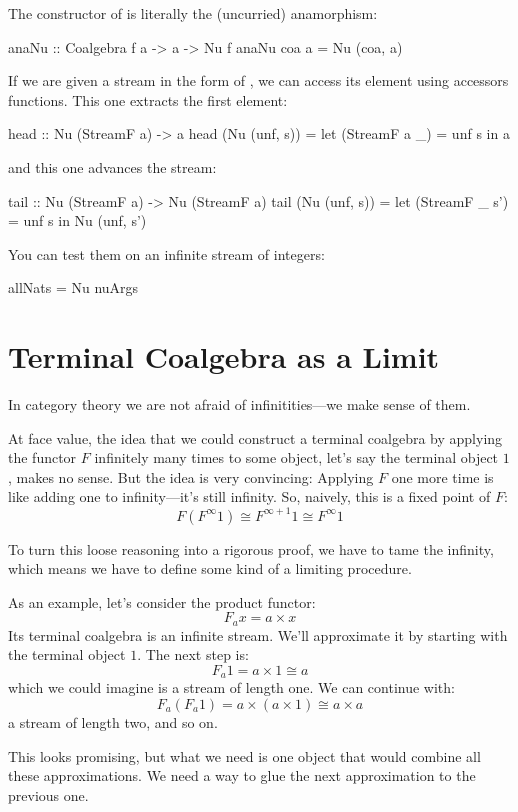 \documentclass[DaoFP]{subfiles}
\begin{document}
The constructor of  is literally the (uncurried) anamorphism:
\begin{haskell}
anaNu :: Coalgebra f a -> a -> Nu f
anaNu coa a = Nu (coa, a)
\end{haskell}

If we are given a stream in the form of , we can access its element using accessors functions. This one extracts the first element:
\begin{haskell}
head :: Nu (StreamF a) -> a
head (Nu (unf, s)) = 
  let (StreamF a _) = unf s 
  in a
\end{haskell}
and this one advances the stream:
\begin{haskell}
tail :: Nu (StreamF a) -> Nu (StreamF a)
tail (Nu (unf, s)) = 
  let (StreamF _ s') = unf s 
  in Nu (unf, s')
\end{haskell}
You can test them on an infinite stream of integers:
\begin{haskell}
allNats = Nu nuArgs
\end{haskell}

\section{Terminal Coalgebra as a Limit}

In category theory we are not afraid of infinitities---we make sense of them. 

At face value, the idea that we could construct a terminal coalgebra by applying the functor $F$ infinitely many times to some object, let's say the terminal object $1$, makes no sense. But the idea is very convincing: Applying $F$ one more time is like adding one to infinity---it's still infinity. So, naively, this is a fixed point of $F$:
\[ F (F^{\infty} 1) \cong F^{\infty + 1} 1 \cong F^{\infty} 1\]

To turn this loose reasoning into a rigorous proof, we have to tame the infinity, which means we have to define some kind of a limiting procedure. 

As an example, let's consider the product functor:
\[F_a x = a \times x \]
Its terminal coalgebra is an infinite stream. We'll approximate it by starting with the terminal object $1$. The next step is:
\[ F_a 1 = a \times 1 \cong a \]
which we could imagine is a stream of length one. We can continue with:
\[ F_a (F_a 1) = a \times (a \times 1) \cong a \times a \]
a stream of length two, and so on. 

This looks promising, but what we need is one object that would combine all these approximations. We need a way to glue the next approximation to the previous one.
\end{document}

